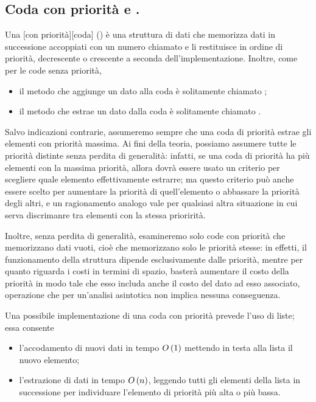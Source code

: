 \subsection{Coda con priorit\`a e .}
\label{AlgoritmiEStruttureDiDati_CodaConPrioritaEHeap}
\begin{Definition}
  Una [con priorit\`a][coda]
  () \`e una struttura di dati che memorizza
  dati in successione accoppiati con un numero chiamato  e li
  restituisce in ordine di priorit\`a, decrescente o crescente a seconda
  dell'implementazione.
  Inoltre, come per le code senza priorit\`a,
  \begin{itemize}
    \item il metodo che aggiunge un dato alla coda \`e solitamente chiamato
      ;
    \item il metodo che estrae un dato dalla coda \`e solitamente chiamato
      .
  \end{itemize}
\end{Definition}
\par Salvo indicazioni contrarie, assumeremo sempre che una coda di priorit\`a
estrae gli elementi con priorit\`a massima.
Ai fini della teoria, possiamo assumere tutte le
priorit\`a distinte senza perdita di generalit\`a: infatti, se una coda di
priorit\`a ha pi\`u elementi con la massima priorit\`a, allora dovr\`a essere
usato un criterio per scegliere quale elemento effettivamente estrarre; ma 
questo criterio pu\`o anche essere scelto per aumentare la priorit\`a di
quell'elemento o abbassare la priorit\`a degli altri, e un ragionamento analogo
vale per qualsiasi altra situazione in cui serva discrimanre tra elementi con
la stessa prioririt\`a.
\par Inoltre, senza perdita di generalit\`a, esamineremo solo code con
priorit\`a che memorizzano dati vuoti, cio\`e che memorizzano solo le priorit\`a
stesse: in effetti, il funzionamento della struttura dipende esclusivamente
dalle priorit\`a, mentre per quanto riguarda i costi in termini di spazio,
baster\`a aumentare il costo della priorit\`a in modo tale che esso includa
anche il costo del dato ad esso associato, operazione che per un'analisi
asintotica non implica nessuna conseguenza.
\par Una possibile implementazione di una coda con priorit\`a prevede l'uso di
liste; essa consente
\begin{itemize}
  \item l'accodamento di nuovi dati in tempo $O \left ( 1 \right )$ mettendo in testa alla
    lista il nuovo elemento;
  \item l'estrazione di dati in tempo $O \left ( n \right )$, leggendo tutti gli elementi
    della lista in successione per individuare l'elemento di priorit\`a pi\`u
    alta o pi\`u bassa.
\end{itemize}

